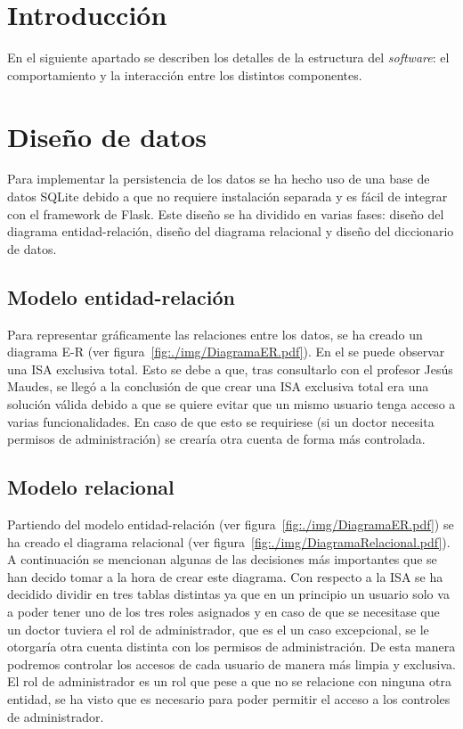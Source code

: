 
\section{Introducción}
En el siguiente apartado se describen los detalles de la estructura del \textit{software}: el comportamiento y la interacción entre los distintos componentes.

\section{Diseño de datos}
Para implementar la persistencia de los datos se ha hecho uso de una base de datos SQLite debido a que no requiere instalación separada y es fácil de integrar con el framework de Flask. Este diseño se ha dividido en varias fases: diseño del diagrama entidad-relación, diseño del diagrama relacional y diseño del diccionario de datos.

\subsection{Modelo entidad-relación}

Para representar gráficamente las relaciones entre los datos, se ha creado un diagrama E-R (ver figura~\ref{fig:./img/DiagramaER.pdf}). En el se puede observar una ISA exclusiva total. Esto se debe a que, tras consultarlo con el profesor Jesús Maudes, se llegó a la conclusión de que crear una ISA exclusiva total era una solución válida debido a que se quiere evitar que un mismo usuario tenga acceso a varias funcionalidades. En caso de que esto se requiriese (si un doctor necesita permisos de administración) se crearía otra cuenta de forma más controlada.


\subsection{Modelo relacional}

Partiendo del modelo entidad-relación (ver figura~\ref{fig:./img/DiagramaER.pdf}) se ha creado el diagrama relacional (ver figura~\ref{fig:./img/DiagramaRelacional.pdf}).
A continuación se mencionan algunas de las decisiones más importantes que se han decido tomar a la hora de crear este diagrama.
Con respecto a la ISA se ha decidido dividir en tres tablas distintas ya que en un principio un usuario solo va a poder tener uno de los tres roles asignados y en caso de que se necesitase que un doctor tuviera el rol de administrador, que es el un caso excepcional, se le otorgaría otra cuenta distinta con los permisos de administración. De esta manera podremos controlar los accesos de cada usuario de manera más limpia y exclusiva.
El rol de administrador es un rol que pese a que no se relacione con ninguna otra entidad, se ha visto que es necesario para poder permitir el acceso a los controles de administrador.




